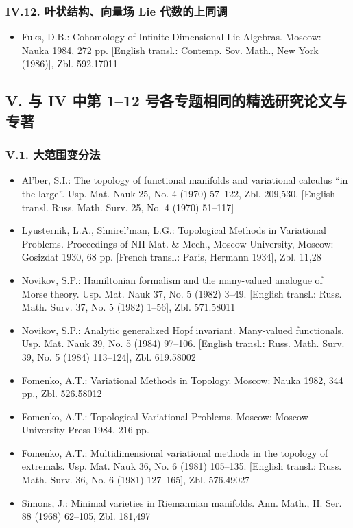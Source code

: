 
\subsubsection*{IV.12. 叶状结构、向量场 Lie 代数的上同调}

\begin{itemize}
\item Fuks, D.B.: Cohomology of Infinite-Dimensional Lie Algebras. Moscow: Nauka 1984, 272 pp. [English transl.: Contemp. Sov. Math., New York (1986)], Zbl. 592.17011
\end{itemize}

\subsection*{V. 与 IV 中第 1--12 号各专题相同的精选研究论文与专著}

\subsubsection*{V.1. 大范围变分法}

\begin{itemize}
\item Al'ber, S.I.: The topology of functional manifolds and variational calculus ``in the large''. Usp. Mat. Nauk 25, No. 4 (1970) 57--122, Zbl. 209,530. [English transl. Russ. Math. Surv. 25, No. 4 (1970) 51--117]
\item Lyusternik, L.A., Shnirel'man, L.G.: Topological Methods in Variational Problems. Proceedings of NII Mat. \& Mech., Moscow University, Moscow: Gosizdat 1930, 68 pp. [French transl.: Paris, Hermann 1934], Zbl. 11,28
\item Novikov, S.P.: Hamiltonian formalism and the many-valued analogue of Morse theory. Usp. Mat. Nauk 37, No. 5 (1982) 3--49. [English transl.: Russ. Math. Surv. 37, No. 5 (1982) 1--56], Zbl. 571.58011
\item Novikov, S.P.: Analytic generalized Hopf invariant. Many-valued functionals. Usp. Mat. Nauk 39, No. 5 (1984) 97--106. [English transl.: Russ. Math. Surv. 39, No. 5 (1984) 113--124], Zbl. 619.58002
\item Fomenko, A.T.: Variational Methods in Topology. Moscow: Nauka 1982, 344 pp., Zbl. 526.58012
\item Fomenko, A.T.: Topological Variational Problems. Moscow: Moscow University Press 1984, 216 pp.
\item Fomenko, A.T.: Multidimensional variational methods in the topology of extremals. Usp. Mat. Nauk 36, No. 6 (1981) 105--135. [English transl.: Russ. Math. Surv. 36, No. 6 (1981) 127--165], Zbl. 576.49027
\item Simons, J.: Minimal varieties in Riemannian manifolds. Ann. Math., II. Ser. 88 (1968) 62--105, Zbl. 181,497
\end{itemize}


